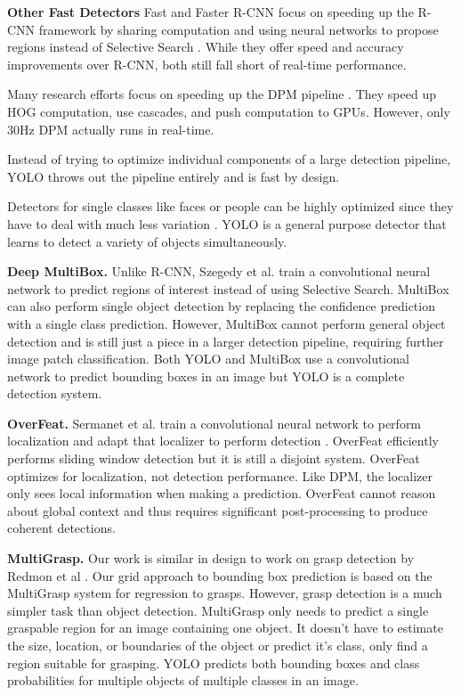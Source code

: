 \textbf{Other Fast Detectors} Fast and Faster R-CNN focus on speeding up the R-CNN framework by sharing computation and using neural networks to propose regions instead of Selective Search \cite{DBLP:journals/corr/Girshick15} \cite{ren2015faster}. While they offer speed and accuracy improvements over R-CNN, both still fall short of real-time performance.

Many research efforts focus on speeding up the DPM pipeline \cite{sadeghi201430hz} \cite{yan2014fastest} \cite{dean2013fast}. They speed up HOG computation, use cascades, and push computation to GPUs. However, only 30Hz DPM \cite{sadeghi201430hz} actually runs in real-time.

Instead of trying to optimize individual components of a large detection pipeline, YOLO throws out the pipeline entirely and is fast by design.

Detectors for single classes like faces or people can be highly optimized since they have to deal with much less variation \cite{viola2004robust}. YOLO is a general purpose detector that learns to detect a variety of objects simultaneously.

\textbf{Deep MultiBox.} Unlike R-CNN, Szegedy et al. train a convolutional neural network to predict regions of interest \cite{erhan2014scalable} instead of using Selective Search. MultiBox can also perform single object detection by replacing the confidence prediction with a single class prediction. However, MultiBox cannot perform general object detection and is still just a piece in a larger detection pipeline, requiring further image patch classification. Both YOLO and MultiBox use a convolutional network to predict bounding boxes in an image but YOLO is a complete detection system.

\textbf{OverFeat.} Sermanet et al. train a convolutional neural network to perform localization and adapt that localizer to perform detection \cite{DBLP:journals/corr/SermanetEZMFL13}. OverFeat efficiently performs sliding window detection but it is still a disjoint system. OverFeat optimizes for localization, not detection performance. Like DPM, the localizer only sees local information when making a prediction. OverFeat cannot reason about global context and thus requires significant post-processing to produce coherent detections.

\textbf{MultiGrasp.} Our work is similar in design to work on grasp detection by Redmon et al \cite{DBLP:journals/corr/RedmonA14}. Our grid approach to bounding box prediction is based on the MultiGrasp system for regression to grasps. However, grasp detection is a much simpler task than object detection. MultiGrasp only needs to predict a single graspable region for an image containing one object. It doesn't have to estimate the size, location, or boundaries of the object or predict it's class, only find a region suitable for grasping. YOLO predicts both bounding boxes and class probabilities for multiple objects of multiple classes in an image.

